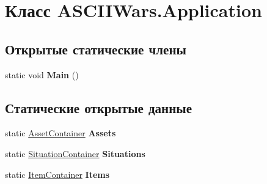 \hypertarget{class_a_s_c_i_i_wars_1_1_application}{}\section{Класс A\+S\+C\+I\+I\+Wars.\+Application}
\label{class_a_s_c_i_i_wars_1_1_application}
\subsection*{Открытые статические члены}
\begin{DoxyCompactItemize}
\item 
\hypertarget{class_a_s_c_i_i_wars_1_1_application_a12dbc4ab81c994876ce7bd2664eee54f}{}\label{class_a_s_c_i_i_wars_1_1_application_a12dbc4ab81c994876ce7bd2664eee54f} 
static void {\bfseries Main} ()
\end{DoxyCompactItemize}
\subsection*{Статические открытые данные}
\begin{DoxyCompactItemize}
\item 
\hypertarget{class_a_s_c_i_i_wars_1_1_application_a85f064f508e8f2448220b04da2ed903c}{}\label{class_a_s_c_i_i_wars_1_1_application_a85f064f508e8f2448220b04da2ed903c} 
static \hyperlink{class_a_s_c_i_i_wars_1_1_game_1_1_asset_container}{Asset\+Container} {\bfseries Assets}
\item 
\hypertarget{class_a_s_c_i_i_wars_1_1_application_ac5e91ee1a174bcb2d25ca9d40bf981b7}{}\label{class_a_s_c_i_i_wars_1_1_application_ac5e91ee1a174bcb2d25ca9d40bf981b7} 
static \hyperlink{class_a_s_c_i_i_wars_1_1_game_1_1_situation_container}{Situation\+Container} {\bfseries Situations}
\item 
\hypertarget{class_a_s_c_i_i_wars_1_1_application_a8ab343a894ec7b250b5e688d844894de}{}\label{class_a_s_c_i_i_wars_1_1_application_a8ab343a894ec7b250b5e688d844894de} 
static \hyperlink{class_a_s_c_i_i_wars_1_1_game_1_1_item_container}{Item\+Container} {\bfseries Items}
\end{DoxyCompactItemize}
